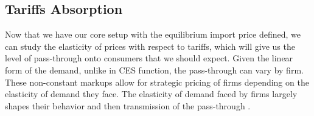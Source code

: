 {%


\subsection{Tariffs Absorption}

Now that we have our core setup with the equilibrium import price defined, we can study the elasticity of prices with respect to tariffs, which will give us the level of pass-through onto consumers that we should expect. Given the linear form of the demand, unlike in CES function, the pass-through can vary by firm. These non-constant markups allow for strategic pricing of firms depending on the elasticity of demand they face. The elasticity of demand faced by firms largely shapes their behavior and then transmission of the pass-through \citep{parentiTheoryMonopolisticCompetition2017, mrazovaNotDemandingDemand2017}. 

}

